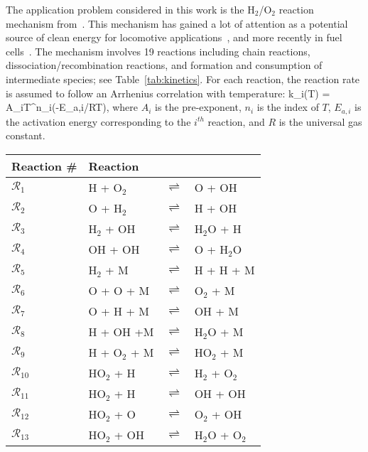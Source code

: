 The application problem considered in this work is the
H$_2$/O$_2$ reaction mechanism from~\cite{Yetter:1991}. This mechanism has gained
a lot of attention as a potential source of clean energy for
locomotive applications~\cite{Das:1996}, and more recently in fuel
 cells~\cite{Loges:2008,Cosnier:2016}. 
The mechanism involves 19
reactions including chain reactions, dissociation/recombination reactions, and
formation and consumption of intermediate species; see Table~\ref{tab:kinetics}. 
For each reaction, the reaction rate is assumed to follow an Arrhenius
correlation with temperature:
%
\be
k_i(T) = A_iT^{n_i}\exp(-E_{a,i}/RT), 
\label{eq:rate}
\ee
%
where $A_i$ is the pre-exponent, $n_i$ is the index of $T$, $E_{a,i}$ is the
activation energy corresponding to the $i^{th}$ reaction, and $R$ is the
universal gas constant.  
%
\begin{table}[htbp]
\renewcommand*{\arraystretch}{0.9}
\begin{center}
\begin{tabular}{llll}
\toprule
Reaction \#     & Reaction &&\\
\bottomrule
$\mathcal{R}_1$ & H + O$_2$          & $\rightleftharpoons$ & O + OH \\
$\mathcal{R}_2$ & O + H$_2$          & $\rightleftharpoons$ & H + OH \\
$\mathcal{R}_3$ & H$_2$ + OH         & $\rightleftharpoons$ & H$_2$O + H \\
$\mathcal{R}_4$ & OH + OH            & $\rightleftharpoons$ & O + H$_2$O \\
$\mathcal{R}_5$ & H$_2$ + M          & $\rightleftharpoons$ & H + H + M \\
$\mathcal{R}_6$ & O + O + M          & $\rightleftharpoons$ & O$_2$ + M \\
$\mathcal{R}_7$ & O + H + M          & $\rightleftharpoons$ & OH + M \\
$\mathcal{R}_8$ & H + OH +M          & $\rightleftharpoons$ & H$_2$O + M \\
$\mathcal{R}_9$ & H + O$_2$ + M      & $\rightleftharpoons$ & HO$_2$ + M \\
$\mathcal{R}_{10}$ & HO$_2$ + H      & $\rightleftharpoons$ & H$_2$ + O$_2$ \\
$\mathcal{R}_{11}$ & HO$_2$ + H      & $\rightleftharpoons$ & OH + OH \\
$\mathcal{R}_{12}$ & HO$_2$ + O      & $\rightleftharpoons$ & O$_2$ + OH \\
$\mathcal{R}_{13}$ & HO$_2$ + OH     & $\rightleftharpoons$ & H$_2$O + O$_2$ \\

\end{tabular}
\end{center}
\end{table}
